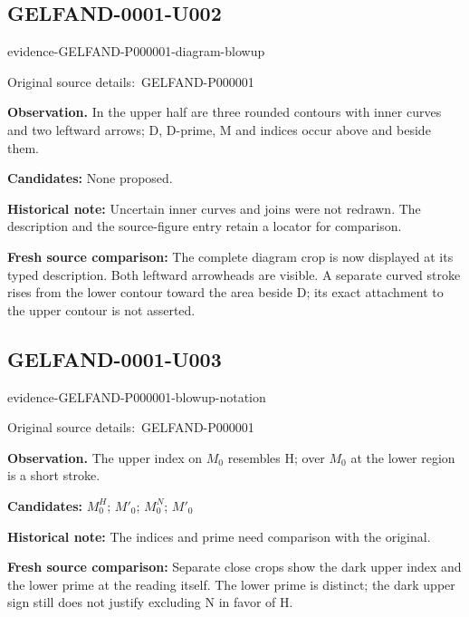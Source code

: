 \documentclass[11pt]{article}
\newcommand{\EvidenceBlock}[4]{%
 \par\smallskip\noindent\begin{minipage}{\linewidth}
 \begin{minipage}[t]{.47\linewidth}\vspace{0pt}\centering
 \csname evidence-#1-#2\endcsname\par
 {\scriptsize\SourceCropCaption\ #1}\par
 \end{minipage}\hfill
 \begin{minipage}[t]{.49\linewidth}\vspace{0pt}\raggedright
 {\small\color{orange!65!black}\textbf{#4} #3}\par
 \end{minipage}
 \end{minipage}\par\smallskip}
\newcommand{\SourceCropCaption}{Original source details:}\newcommand{\ReadingCaption}{Uncertain reading.}\newcommand{\IncompleteCaption}{Undeciphered passage.}\newcommand{\DiagramCaption}{Diagram and typed description.}
\begin{document}
\subsection*{GELFAND-0001-U002}
\EvidenceBlock{GELFAND-P000001}{diagram-blowup}{In the upper half are three rounded contours with inner curves and two leftward arrows; D, D-prime, M and indices occur above and beside them.}{Observation.}
\par\smallskip\noindent\textbf{Candidates: } None proposed.\par
\par\smallskip\noindent\textbf{Historical note: } Uncertain inner curves and joins were not redrawn. The description and the source-figure entry retain a locator for comparison.\par
\par\smallskip\noindent\textbf{Fresh source comparison: } The complete diagram crop is now displayed at its typed description. Both leftward arrowheads are visible. A separate curved stroke rises from the lower contour toward the area beside D; its exact attachment to the upper contour is not asserted.\par
\subsection*{GELFAND-0001-U003}
\EvidenceBlock{GELFAND-P000001}{blowup-notation}{The upper index on \(M_0\) resembles H; over \(M_0\) at the lower region is a short stroke.}{Observation.}
\par\smallskip\noindent\textbf{Candidates: } \(M_0^H\); \(M'_0\); \(M_0^N\); \(M'_0\)\par
\par\smallskip\noindent\textbf{Historical note: } The indices and prime need comparison with the original.\par
\par\smallskip\noindent\textbf{Fresh source comparison: } Separate close crops show the dark upper index and the lower prime at the reading itself. The lower prime is distinct; the dark upper sign still does not justify excluding N in favor of H.\par
\end{document}
